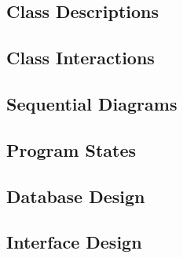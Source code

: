 \documentclass[12pt]{article}
\begin{document}
\subsection{Class Descriptions}


\subsection{Class Interactions}


\subsection{Sequential Diagrams}


\subsection{Program States}


\subsection{Database Design}


\subsection{Interface Design}

\end{document}

